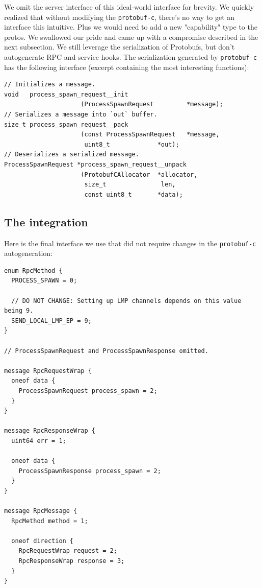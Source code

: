 We omit the server interface of this ideal-world interface for brevity. We quickly realized that without modifying the \texttt{protobuf-c}, there's no way to get an interface this intuitive. Plus we would need to add a new "capability" type to the protos. We swallowed our pride and came up with a compromise described in the next subsection. We still leverage the serialization of Protobufs, but don't autogenerate RPC and service hooks. The serialization generated by \texttt{protobuf-c} has the following interface (excerpt containing the most interesting functions):
\begin{verbatim}
// Initializes a message.
void   process_spawn_request__init
                     (ProcessSpawnRequest         *message);
// Serializes a message into `out` buffer.
size_t process_spawn_request__pack
                     (const ProcessSpawnRequest   *message,
                      uint8_t             *out);
// Deserializes a serialized message.
ProcessSpawnRequest *process_spawn_request__unpack
                     (ProtobufCAllocator  *allocator,
                      size_t               len,
                      const uint8_t       *data);
\end{verbatim}

\subsection{The integration}
Here is the final interface we use that did not require changes in the \texttt{protobuf-c} autogeneration:
\begin{verbatim}
enum RpcMethod {
  PROCESS_SPAWN = 0;
  
  // DO NOT CHANGE: Setting up LMP channels depends on this value being 9.
  SEND_LOCAL_LMP_EP = 9;
}

// ProcessSpawnRequest and ProcessSpawnResponse omitted.

message RpcRequestWrap {
  oneof data {
    ProcessSpawnRequest process_spawn = 2;
  }
}

message RpcResponseWrap {
  uint64 err = 1;

  oneof data {
    ProcessSpawnResponse process_spawn = 2;
  }
}

message RpcMessage {
  RpcMethod method = 1;

  oneof direction {
    RpcRequestWrap request = 2;
    RpcResponseWrap response = 3;
  }
}
\end{verbatim}

